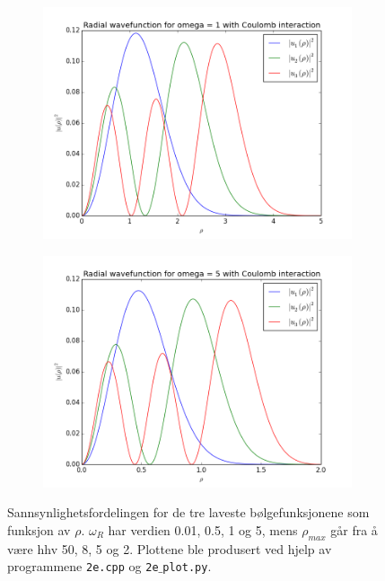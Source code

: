 \documentclass{article}
\begin{document}
\FloatBarrier
\begin{figure}[!ht]
\begin{subfigure}{.6\textwidth}
  \includegraphics[width=1.1\linewidth]{2e_1_ON.png}
  \label{fig:sfig1}
\end{subfigure}%
\begin{subfigure}{.6\textwidth}
  \includegraphics[width=1.1\linewidth]{2e_5_ON.png}
  \label{fig:sfig2}
\end{subfigure}
\label{fig:animasjon}
\caption{Sannsynlighetsfordelingen for de tre laveste bølgefunksjonene som funksjon av $\rho$. $\omega_R$ har verdien 0.01, 0.5, 1 og 5, mens $\rho_{max}$ går fra å være hhv 50, 8, 5 og 2. Plottene ble produsert ved hjelp av programmene \texttt{2e.cpp} og \texttt{2e$\_$plot.py}.}
\end{figure}
\FloatBarrier
\end{document}
